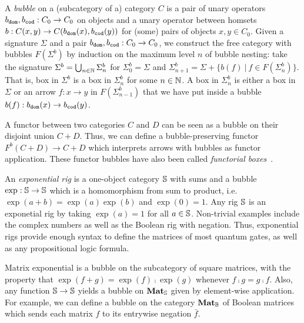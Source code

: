 A \emph{bubble} on a (subcategory of a) category $C$ is a pair of unary operators $b_\dom, b_\cod : C_0 \to C_0$ on objects and a unary operator between homsets $b : C(x, y) \to C(b_\dom(x), b_\cod(y))$ for (some) pairs of objects $x, y \in C_0$.
Given a signature $\Sigma$ and a pair $b_\dom, b_\cod : C_0 \to C_0$, we construct the free category with bubbles $F(\Sigma^b)$ by induction on the maximum level $n$ of bubble nesting: take the signature $\Sigma^b = \bigcup_{n \in \N} \Sigma^b_n$
for $\Sigma^b_0 = \Sigma$ and $\Sigma^b_{n + 1} = \Sigma + \{ b(f) \ \vert \ f \in F(\Sigma^b_n) \}$.
That is, box in $\Sigma^b$ is a box in $\Sigma^b_{n}$ for some $n \in \N$.
A box in $\Sigma^b_{n}$ is either a box in $\Sigma$ or an arrow $f : x \to y$ in $F(\Sigma^b_{n - 1})$ that we have put inside a bubble $b(f) : b_\dom(x) \to b_\cod(y)$.

\begin{example}
A functor between two categories $C$ and $D$ can be seen as a bubble on their disjoint union $C + D$.
Thus, we can define a bubble-preserving functor $F^b(C + D) \to C + D$ which interprets arrows with bubbles as functor application.
These functor bubbles have also been called \emph{functorial boxes}~\cite{Mellies06}.
\end{example}

\begin{example}
An \emph{exponential rig} is a one-object category $\S$ with sums and a bubble $\exp : \S \to \S$ which is a homomorphism from sum to product, i.e. $\exp(a + b) = \exp(a) \exp(b)$ and $\exp(0) = 1$.
Any rig $\S$ is an exponetial rig by taking $\exp(a) = 1$ for all $a \in \S$.
Non-trivial examples include the complex numbers as well as the Boolean rig with negation.
Thus, exponential rigs provide enough syntax to define the matrices of most quantum gates, as well as any propositional logic formula.
\end{example}

\begin{example}
Matrix exponential is a bubble on the subcategory of square matrices, with the property that $\exp(f + g) = \exp(f) \fcmp \exp(g)$ whenever $f \fcmp g = g \fcmp f$.
Also, any function $\S \to \S$ yields a bubble on $\mathbf{Mat}_\S$ given by element-wise application.
For example, we can define a bubble on the category $\mathbf{Mat}_\B$ of Boolean matrices which sends each matrix $f$ to its entrywise negation $\bar{f}$.
\end{example}

